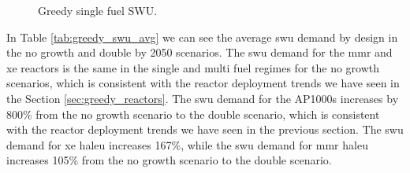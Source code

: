 
\begin{figure}[H]
  \hfill
  \caption{Greedy single fuel SWU.}
  \label{fig:greedy_of_swu}
\end{figure}

In Table \ref{tab:greedy_swu_avg} we can see the average \gls{swu} demand by design in the no growth and double by 2050 scenarios. The \gls{swu} demand for the \gls{mmr} and \gls{xe} reactors is the same in the single and multi fuel regimes for the no growth scenarios, which is consistent with the reactor deployment trends we have seen in the Section \ref{sec:greedy_reactors}. The \gls{swu} demand for the AP1000s increases by 800\% from the no growth scenario to the double scenario, which is consistent with the reactor deployment trends we have seen in the previous section. The \gls{swu} demand for \gls{xe} \gls{haleu} increases 167\%, while the \gls{swu} demand for \gls{mmr} \gls{haleu} increases 105\% from the no growth scenario to the double scenario.


